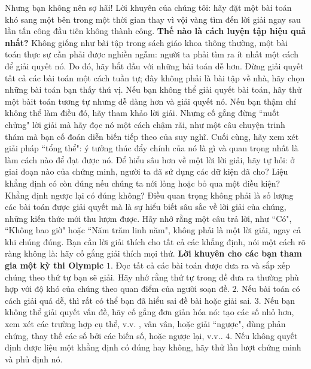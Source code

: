 \begin{multicols}{2}
	\vskip 0.1cm
	Nhưng bạn không nên sợ hãi! Lời khuyên của chúng tôi: hãy đặt một bài toán khó sang một bên trong một thời gian thay vì vội vàng tìm đến lời giải ngay sau lần tấn công đầu tiên không thành công.
	\vskip 0.1cm
	\textbf{\color{cackithi}Thế nào là cách luyện tập hiệu quả nhất?}
	\vskip 0.1cm
	Không giống như bài tập trong sách giáo khoa thông thường, một bài toán thực sự cần phải được nghiền ngẫm: người ta phải tìm ra ít nhất một cách để giải quyết nó. Do đó, hãy bắt đầu với những bài toán dễ hơn. Đừng giải quyết tất cả các bài toán một cách tuần tự; đây không phải là bài tập về nhà, hãy chọn những bài toán bạn thấy thú vị.  Nếu bạn không thể giải quyết bài toán, hãy thử một bàit toán tương tự nhưng dễ dàng hơn và giải quyết nó. Nếu bạn thậm chí không thể làm điều đó, hãy tham khảo lời giải. Nhưng cố gắng đừng ``nuốt chửng" lời giải mà hãy đọc nó một cách chậm rãi, như một câu chuyện trinh thám mà bạn cố đoán diễn biến tiếp theo của suy nghĩ. Cuối cùng, hãy xem xét giải pháp ``tổng thể": ý tưởng thúc đẩy chính của nó là gì và quan trọng nhất là làm cách nào để đạt được nó.
	\vskip 0.1cm
	Để hiểu sâu hơn về một lời lời giải, hãy tự hỏi: ở giai đoạn nào của chứng minh, người ta đã sử dụng các dữ kiện đã cho? Liệu khẳng định có còn đúng nếu chúng ta nới lỏng hoặc bỏ qua một điều kiện? Khẳng định ngược lại có đúng không? Điều quan trọng không phải là số lượng các bài toán được giải quyết mà là sự hiểu biết sâu sắc về lời giải của chúng, những kiến thức mới thu lượm được. 
	\vskip 0.1cm
	Hãy nhớ rằng một câu trả lời, như ``Có", ``Không bao giờ" hoặc ``Năm trăm linh năm", không phải là một lời giải, ngay cả khi chúng đúng. Bạn cần lời giải thích cho tất cả các khẳng định, nói một cách rõ ràng không là: hãy cố gắng giải thích mọi thứ.  
	\vskip 0.1cm
	\textbf{\color{cackithi}Lời khuyên cho các bạn tham gia một kỳ thi Olympic}
	\vskip 0.1cm
	$1.$ Đọc tất cả các bài toán được đưa ra và sắp xếp chúng theo thứ tự bạn sẽ giải. Hãy nhớ rằng thứ tự trong đề đưa ra thường phù hợp với độ khó của chúng theo quan điểm của người soạn đề.
	\vskip 0.1cm
	$2.$ Nếu bài toán có cách giải quá dễ, thì rất có thể bạn đã hiểu sai đề bài hoặc giải sai.  
	\vskip 0.1cm
	$3.$ Nếu bạn không thể giải quyết vấn đề, hãy cố gắng đơn giản hóa nó: tạo các số nhỏ hơn, xem xét các trường hợp cụ thể, v.v. , vân vân, hoặc giải ``ngược", dùng phản chứng, thay thế các số bởi các biến số, hoặc ngược lại, \linebreak v.v..
	\vskip 0.1cm
	$4.$ Nếu không quyết định được liệu một khẳng định có đúng hay không, hãy thử lần lượt chứng minh và phủ định nó.

\end{multicols}
